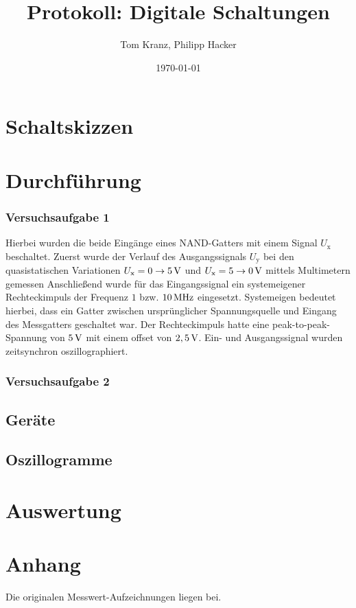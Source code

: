 \documentclass[numbers=noenddot,12pt,a4paper]{scrartcl}
\title{Protokoll: Digitale Schaltungen}
\author{Tom Kranz, Philipp Hacker}
\date{\today}
\newcommand{\ix}[1]{_\text{#1}}
\begin{document}
\maketitle
\vspace*{\fill}
\tableofcontents
\vfill
\newpage
\section{Schaltskizzen}
\section{Durchführung}
\subsubsection{Versuchsaufgabe 1}
Hierbei wurden die beide Eingänge eines NAND-Gatters mit einem Signal $U\ix{x}$ beschaltet. Zuerst wurde der Verlauf des Ausgangssignals $U\ix{y}$ bei den quasistatischen Variationen $U\ix{x}=0\rightarrow\unit[5]{V}$ und $U\ix{x}=5\rightarrow\unit[0]{V}$ mittels Multimetern gemessen Anschließend wurde für das Eingangssignal ein systemeigener Rechteckimpuls der Frequenz $1$ bzw. $\unit[10]{MHz}$ eingesetzt. Systemeigen bedeutet hierbei, dass ein Gatter zwischen ursprünglicher Spannungsquelle und Eingang des Messgatters geschaltet war. Der Rechteckimpuls hatte eine peak-to-peak-Spannung von $\unit[5]{V}$ mit einem offset von $\unit[2,5]{V}$. Ein- und Ausgangssignal wurden zeitsynchron oszillographiert.
\subsubsection{Versuchsaufgabe 2}
\subsection{Geräte} \label{sec:gerät}
\subsection{Oszillogramme}
\section{Auswertung}
\section{Anhang}
Die originalen Messwert-Aufzeichnungen liegen bei.
\end{document}
